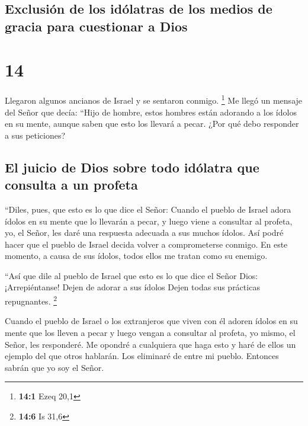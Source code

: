 \hypertarget{exclusiuxf3n-de-los-iduxf3latras-de-los-medios-de-gracia-para-cuestionar-a-dios}{%
\subsection{Exclusión de los idólatras de los medios de gracia para
cuestionar a
Dios}\label{exclusiuxf3n-de-los-iduxf3latras-de-los-medios-de-gracia-para-cuestionar-a-dios}}

\hypertarget{section-13}{%
\section{14}\label{section-13}}

 Llegaron algunos ancianos de Israel y se sentaron
conmigo. \footnote{\textbf{14:1} Ezeq 20,1}  Me llegó un
mensaje del Señor que decía:  ``Hijo de hombre, estos
hombres están adorando a los ídolos en su mente, aunque saben que esto
los llevará a pecar. ¿Por qué debo responder a sus peticiones?

\hypertarget{el-juicio-de-dios-sobre-todo-iduxf3latra-que-consulta-a-un-profeta}{%
\subsection{El juicio de Dios sobre todo idólatra que consulta a un
profeta}\label{el-juicio-de-dios-sobre-todo-iduxf3latra-que-consulta-a-un-profeta}}

 ``Diles, pues, que esto es lo que dice el Señor: Cuando
el pueblo de Israel adora ídolos en su mente que lo llevarán a pecar, y
luego viene a consultar al profeta, yo, el Señor, les daré una respuesta
adecuada a sus muchos ídolos.  Así podré hacer que el
pueblo de Israel decida volver a comprometerse conmigo. En este momento,
a causa de sus ídolos, todos ellos me tratan como su enemigo.

 ``Así que dile al pueblo de Israel que esto es lo que
dice el Señor Dios: ¡Arrepiéntanse! Dejen de adorar a sus ídolos Dejen
todas sus prácticas repugnantes. \footnote{\textbf{14:6} Is 31,6}

 Cuando el pueblo de Israel o los extranjeros que viven
con él adoren ídolos en su mente que los lleven a pecar y luego vengan a
consultar al profeta, yo mismo, el Señor, les responderé. 
Me opondré a cualquiera que haga esto y haré de ellos un ejemplo del que
otros hablarán. Los eliminaré de entre mi pueblo. Entonces sabrán que yo
soy el Señor.

